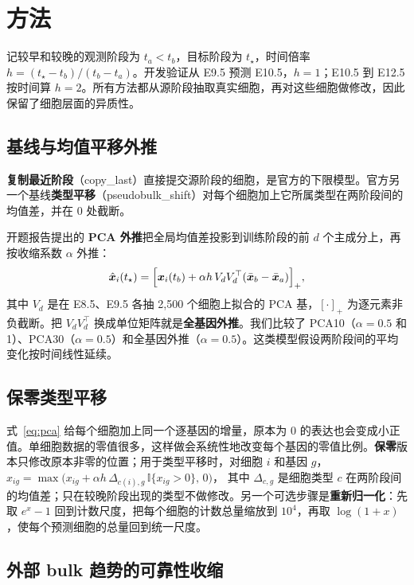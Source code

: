 \documentclass[UTF8,zihao=-4,fontset=none,a4paper]{ctexart}
\begin{document}
\section{方法}

记较早和较晚的观测阶段为 $t_a<t_b$，目标阶段为 $t_\star$，时间倍率 $h=(t_\star-t_b)/(t_b-t_a)$。开发验证从 E9.5 预测 E10.5，$h=1$；E10.5 到 E12.5 按时间算 $h=2$。所有方法都从源阶段抽取真实细胞，再对这些细胞做修改，因此保留了细胞层面的异质性。

\subsection{基线与均值平移外推}

\textbf{复制最近阶段}（copy\_last）直接提交源阶段的细胞，是官方的下限模型。官方另一个基线\textbf{类型平移}（pseudobulk\_shift）对每个细胞加上它所属类型在两阶段间的均值差，并在 0 处截断。

开题报告提出的 \textbf{PCA 外推}把全局均值差投影到训练阶段的前 $d$ 个主成分上，再按收缩系数 $\alpha$ 外推：
\begin{equation}
\hat{\bm x}_i(t_\star)=\Bigl[\bm x_i(t_b)+\alpha h\,V_dV_d^\top(\bar{\bm x}_b-\bar{\bm x}_a)\Bigr]_+ ,
\label{eq:pca}
\end{equation}
其中 $V_d$ 是在 E8.5、E9.5 各抽 2,500 个细胞上拟合的 PCA 基，$[\cdot]_+$ 为逐元素非负截断。把 $V_dV_d^\top$ 换成单位矩阵就是\textbf{全基因外推}。我们比较了 PCA10（$\alpha=0.5$ 和 1）、PCA30（$\alpha=0.5$）和全基因外推（$\alpha=0.5$）。这类模型假设两阶段间的平均变化按时间线性延续。

\subsection{保零类型平移}

式~\eqref{eq:pca} 给每个细胞加上同一个逐基因的增量，原本为 0 的表达也会变成小正值。单细胞数据的零值很多，这样做会系统性地改变每个基因的零值比例。\textbf{保零}版本只修改原本非零的位置；用于类型平移时，对细胞 $i$ 和基因 $g$，
$\hat x_{ig}=\max\bigl(x_{ig}+\alpha h\,\Delta_{c(i),g}\,\mathbb{I}\{x_{ig}>0\},\,0\bigr)$，
其中 $\Delta_{c,g}$ 是细胞类型 $c$ 在两阶段间的均值差；只在较晚阶段出现的类型不做修改。另一个可选步骤是\textbf{重新归一化}：先取 $e^x-1$ 回到计数尺度，把每个细胞的计数总量缩放到 $10^4$，再取 $\log(1+x)$，使每个预测细胞的总量回到统一尺度。

\subsection{外部 bulk 趋势的可靠性收缩}
\end{document}

